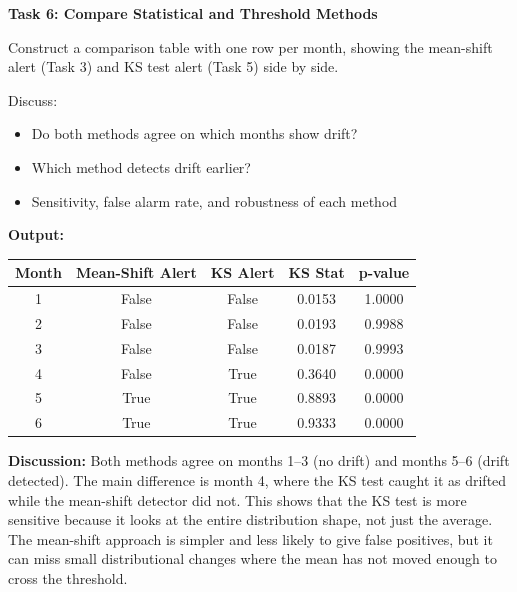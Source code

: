 \documentclass[12pt,a4paper]{article}
\begin{document}
\vspace{24pt}

\begin{tcolorbox}
\textbf{Task 6: Compare Statistical and Threshold Methods}

Construct a comparison table with one row per month, showing the mean-shift alert (Task 3) and KS test alert (Task 5) side by side.

Discuss:
\begin{itemize}
\item Do both methods agree on which months show drift?
\item Which method detects drift earlier?
\item Sensitivity, false alarm rate, and robustness of each method
\end{itemize}
\end{tcolorbox}

\vspace{6pt}

\textbf{Output:}

\begin{center}
\renewcommand{\arraystretch}{1.4}
\begin{tabular}{ccccc}
\toprule
\textbf{Month} & \textbf{Mean-Shift Alert} & \textbf{KS Alert} & \textbf{KS Stat} & \textbf{p-value} \\
\midrule
1 & False & False & 0.0153 & 1.0000 \\
2 & False & False & 0.0193 & 0.9988 \\
3 & False & False & 0.0187 & 0.9993 \\
4 & False & True & 0.3640 & 0.0000 \\
5 & True & True & 0.8893 & 0.0000 \\
6 & True & True & 0.9333 & 0.0000 \\
\bottomrule
\end{tabular}
\renewcommand{\arraystretch}{1.0}
\end{center}

\vspace{4pt}
\textbf{Discussion:} Both methods agree on months 1--3 (no drift) and months 5--6 (drift detected). The main difference is month 4, where the KS test caught it as drifted while the mean-shift detector did not. This shows that the KS test is more sensitive because it looks at the entire distribution shape, not just the average. The mean-shift approach is simpler and less likely to give false positives, but it can miss small distributional changes where the mean has not moved enough to cross the threshold.
\end{document}
